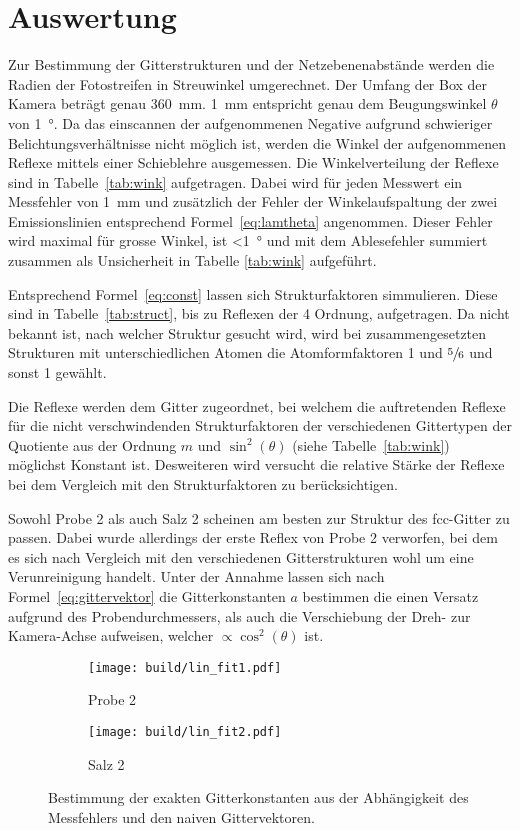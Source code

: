 \section{Auswertung}\label{sec:Auswertung}

Zur Bestimmung der Gitterstrukturen und der Netzebenenabstände werden die
Radien der Fotostreifen in Streuwinkel umgerechnet.
Der Umfang der Box der Kamera beträgt genau \SI{360}{\milli\meter}.
\SI{1}{\milli\meter} entspricht genau dem Beugungswinkel $\theta$ von
\SI{1}{\degree}.
Da das einscannen der aufgenommenen Negative aufgrund schwieriger
Belichtungsverhältnisse nicht möglich ist, werden die Winkel der aufgenommenen
Reflexe mittels einer Schieblehre ausgemessen.
Die Winkelverteilung der Reflexe sind in Tabelle~\ref{tab:wink} aufgetragen.
Dabei wird für jeden Messwert ein Messfehler von \SI{1}{\milli\meter} und
zusätzlich der Fehler der Winkelaufspaltung der zwei Emissionslinien
entsprechend Formel~\ref{eq:lamtheta} angenommen.
Dieser Fehler wird maximal für grosse Winkel, ist \SI{<1}{\degree} und mit dem
Ablesefehler summiert zusammen als Unsicherheit in Tabelle \ref{tab:wink}
aufgeführt.

Entsprechend Formel~\eqref{eq:const} lassen sich Strukturfaktoren simmulieren.
Diese sind in Tabelle~\ref{tab:struct}, bis zu Reflexen der 4 Ordnung, aufgetragen.
Da nicht bekannt ist, nach welcher Struktur gesucht wird, wird bei
zusammengesetzten Strukturen mit unterschiedlichen Atomen die Atomformfaktoren
1 und $\sfrac{5}{6}$ und sonst 1 gewählt.

Die Reflexe werden dem Gitter zugeordnet, bei welchem die auftretenden Reflexe für
die nicht verschwindenden Strukturfaktoren der verschiedenen Gittertypen der
Quotiente aus der Ordnung $m$ und $\sin^2(\theta)$ (siehe Tabelle~\ref{tab:wink})
möglichst Konstant ist.
Desweiteren wird versucht die relative Stärke der Reflexe bei dem Vergleich mit den
Strukturfaktoren zu berücksichtigen.

Sowohl Probe 2 als auch Salz 2 scheinen am besten zur Struktur des fcc-Gitter zu
passen.
Dabei wurde allerdings der erste Reflex von Probe 2 verworfen, bei dem es sich
nach Vergleich mit den verschiedenen Gitterstrukturen wohl um eine Verunreinigung
handelt.
Unter der Annahme lassen sich nach Formel~\eqref{eq:gittervektor} die
Gitterkonstanten $a$ bestimmen die einen Versatz aufgrund des
Probendurchmessers, als auch die Verschiebung der Dreh- zur Kamera-Achse
aufweisen, welcher $\propto \cos^2(\theta)$ ist.
\begin{figure}[ht]
		\centering
		\begin{subfigure}{0.49\textwidth}
				\centering
				\texttt{[image: build/lin\_fit1.pdf]}
				\caption{Probe 2}
				\label{fig:prb1}
		\end{subfigure}
		\begin{subfigure}{0.49\textwidth}
				\centering
				\texttt{[image: build/lin\_fit2.pdf]}
				\caption{Salz 2}
				\label{fig:prb1}
		\end{subfigure}
		\caption{Bestimmung der exakten Gitterkonstanten aus der Abhängigkeit
		des	Messfehlers und den naiven Gittervektoren.}
\end{figure}

